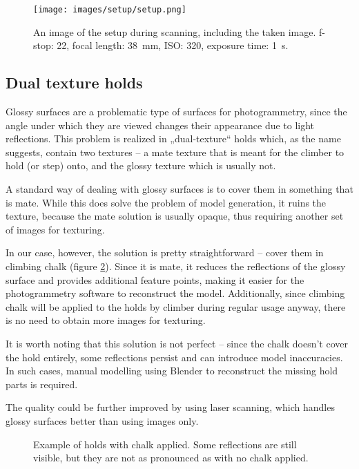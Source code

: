 \begin{figure}
	\centering
	\texttt{[image: images/setup/setup.png]}
	\caption{An image of the setup during scanning, including the taken image. f-stop: 22, focal length: \SI{38}{\milli\meter}, ISO: 320, exposure time: \SI{1}{\second}.}
	  
	\label{fig:setup}
\end{figure}

\subsection{Dual texture holds}\label{sec:dual}
Glossy surfaces are a problematic type of surfaces for photogrammetry, since the angle under which they are viewed changes their appearance due to light reflections.
This problem is realized in „dual-texture“ holds which, as the name suggests, contain two textures -- a mate texture that is meant for the climber to hold (or step) onto, and the glossy texture which is usually not.

A standard way of dealing with glossy surfaces is to cover them in something that is mate.
While this does solve the problem of model generation, it ruins the texture, because the mate solution is usually opaque, thus requiring another set of images for texturing.

In our case, however, the solution is pretty straightforward -- cover them in climbing chalk (figure \ref{fig:chalk}).
Since it is mate, it reduces the reflections of the glossy surface and provides additional feature points, making it easier for the photogrammetry software to reconstruct the model.
Additionally, since climbing chalk will be applied to the holds by climber during regular usage anyway, there is no need to obtain more images for texturing.

It is worth noting that this solution is not perfect -- since the chalk doesn't cover the hold entirely, some reflections persist and can introduce model inaccuracies.
In such cases, manual modelling using Blender to reconstruct the missing hold parts is required.

The quality could be further improved by using laser scanning, which handles glossy surfaces better than using images only.

\begin{figure}[t]
	\centering
	\hfill
	\hfill
	\caption{Example of holds with chalk applied. Some reflections are still visible, but they are not as pronounced as with no chalk applied.}%
	\label{fig:chalk}
\end{figure}

